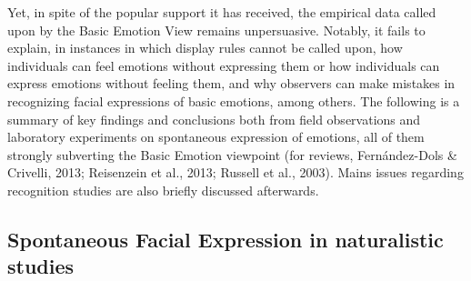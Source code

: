 \documentclass[
  english,
  doc]{apa7}
\begin{document}
Yet, in spite of the popular support it has received, the empirical data called upon by the Basic Emotion View remains unpersuasive. Notably, it fails to explain, in instances in which display rules cannot be called upon, how individuals can feel emotions without expressing them or how individuals can express emotions without feeling them, and why observers can make mistakes in recognizing facial expressions of basic emotions, among others. The following is a summary of key findings and conclusions both from field observations and laboratory experiments on spontaneous expression of emotions, all of them strongly subverting the Basic Emotion viewpoint (for reviews, Fernández-Dols \& Crivelli, 2013; Reisenzein et al., 2013; Russell et al., 2003). Mains issues regarding recognition studies are also briefly discussed afterwards.

\hypertarget{spontaneous-facial-expression-in-naturalistic-studies}{%
\subsection{Spontaneous Facial Expression in naturalistic studies}\label{spontaneous-facial-expression-in-naturalistic-studies}}
\end{document}
